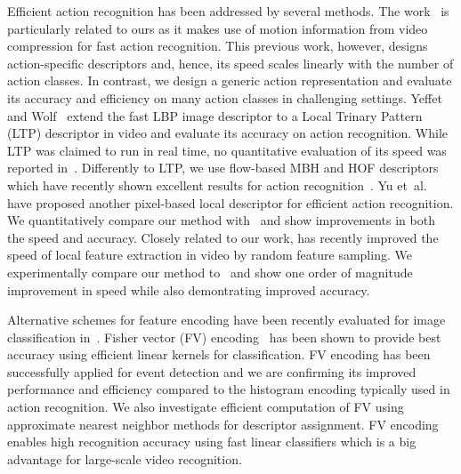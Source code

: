 \documentclass[10pt,twocolumn,letterpaper]{article}
\begin{document}


Efficient action recognition has been addressed by several
methods. The work~\cite{mpeg3,mpeg2,mpeg1} is particularly
related to ours as it makes use of motion information from video compression for fast action recognition. This previous work,
however, designs action-specific descriptors and, hence, its
speed scales linearly with the number of action classes. In
contrast, we design a generic action representation and evaluate its accuracy and efficiency on many action classes in
challenging settings.
Yeffet and Wolf~\cite{Yeffet09} extend the fast LBP image
descriptor to a Local Trinary Pattern (LTP) descriptor in video
and evaluate its accuracy on action recognition. While LTP was
claimed to run in real time, no quantitative evaluation of its
speed was reported in~\cite{Yeffet09}. Differently to LTP, we
use flow-based MBH and HOF descriptors which have recently shown excellent results for action recognition~\cite{Wang12}. Yu
et~al.~\cite{Yu10} have proposed another pixel-based local
descriptor for efficient action recognition. We quantitatively
compare our method with~\cite{Yu10} and show improvements in
both the speed and accuracy.
Closely related to our work, \cite{Feng13} has 
recently improved the speed of local feature extraction in video
by random feature sampling.
We experimentally compare our method to~\cite{Feng13}
and show one order of magnitude improvement in speed while 
also demontrating improved accuracy.


Alternative schemes for feature encoding
have been recently evaluated for image classification
in~\cite{Chatfield11}.
Fisher vector (FV) encoding~\cite{Perronnin10} has been shown to provide best accuracy using efficient linear kernels for
classification. FV encoding has been successfully applied for
event detection \cite{Revaud13} and we are confirming its
improved performance and efficiency compared to the
histogram encoding typically used in action recognition. We also investigate efficient computation of FV using approximate
nearest neighbor methods for descriptor assignment. FV encoding enables high recognition accuracy using fast linear
classifiers which is a big advantage for large-scale video
recognition. \smallskip
\end{document}
